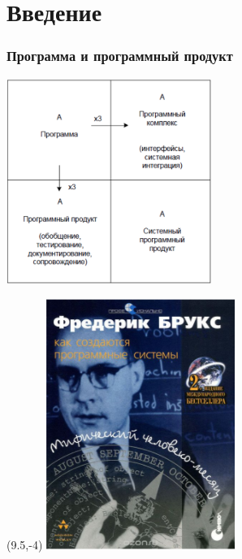 \documentclass{../../slides-style}
\begin{document}
    \section{Введение}

    \begin{frame}
        \frametitle{Программа и программный продукт}
        \begin{center}
            \includegraphics[width=0.5\textwidth]{brooksSquare.png}
        \end{center}
        \begin{textblock}{2}(9.5,-4)
            \includegraphics[width=\textwidth]{brooksCover.png}
        \end{textblock}
    \end{frame}
\end{document}
